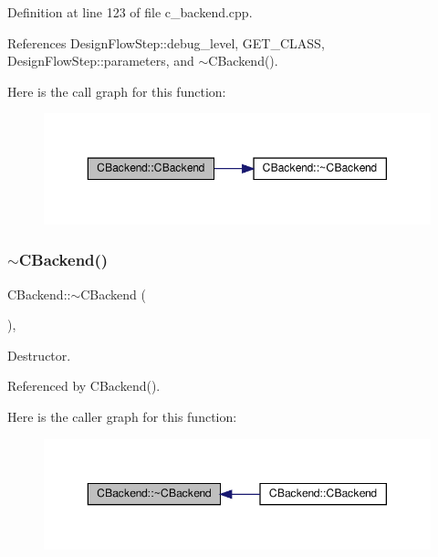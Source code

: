 Definition at line 123 of file c\+\_\+backend.\+cpp.



References Design\+Flow\+Step\+::debug\+\_\+level, G\+E\+T\+\_\+\+C\+L\+A\+SS, Design\+Flow\+Step\+::parameters, and $\sim$\+C\+Backend().

Here is the call graph for this function\+:
\nopagebreak
\begin{figure}[H]
\begin{center}
\leavevmode
\includegraphics[width=350pt]{d3/de2/classCBackend_a1e313cf2e64972680a630fffda96ef7e_cgraph}
\end{center}
\end{figure}
\mbox{\label{classCBackend_ae558a515c1e10643bf4016ab63493160}} 
\subsubsection{\texorpdfstring{$\sim$\+C\+Backend()}{~CBackend()}}
{\footnotesize\ttfamily C\+Backend\+::$\sim$\+C\+Backend (\begin{DoxyParamCaption}{ }\end{DoxyParamCaption})\hspace{0.3cm}{\ttfamily [override]}, {\ttfamily [default]}}



Destructor. 



Referenced by C\+Backend().

Here is the caller graph for this function\+:
\nopagebreak
\begin{figure}[H]
\begin{center}
\leavevmode
\includegraphics[width=350pt]{d3/de2/classCBackend_ae558a515c1e10643bf4016ab63493160_icgraph}
\end{center}
\end{figure}


